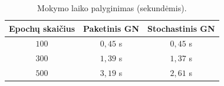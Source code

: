 \begin{table}[H]
    \centering
    \caption{Mokymo laiko palyginimas (sekundėmis).}
    \begin{tabular}{|c|c|c|}
        \hline
        Epochų skaičius & Paketinis GN & Stochastinis GN \\
        \hline
        $100$ & $0{,}45$ s & $0{,}45$ s \\ \hline
        $300$ & $1{,}39$ s & $1{,}37$ s \\ \hline
        $500$ & $3{,}19$ s & $2{,}61$ s \\ \hline
    \end{tabular}
    \label{tab:time_comparison}
\end{table}